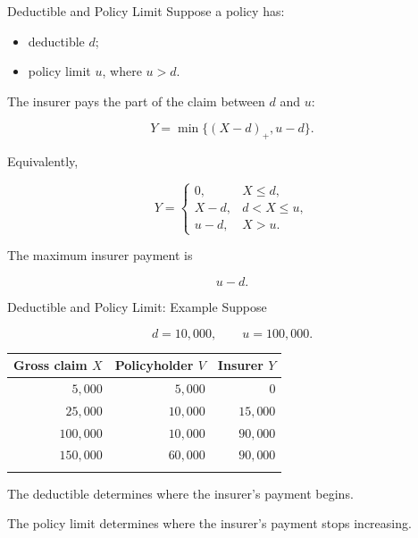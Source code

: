 \documentclass[
  ignorenonframetext,
  aspectratio=169,
]{beamer}
\newcounter{none} %
\providecommand{\tightlist}{%
  \setlength{\itemsep}{0pt}\setlength{\parskip}{0pt}}
\begin{document}
\begin{frame}{Deductible and Policy Limit}
\protect{}\label{deductible-and-policy-limit}
Suppose a policy has:

\begin{itemize}
\tightlist
\item
  deductible \(d\);
\item
  policy limit \(u\), where \(u>d\).
\end{itemize}

The insurer pays the part of the claim between \(d\) and \(u\):

\[
\boxed{
Y=\min\{(X-d)_+,u-d\}.
}
\]

Equivalently,

\[
Y=
\begin{cases}
0, & X\leq d,\\
X-d, & d<X\leq u,\\
u-d, & X>u.
\end{cases}
\]

The maximum insurer payment is

\[
\boxed{u-d}.
\]
\end{frame}

\begin{frame}{Deductible and Policy Limit: Example}
\protect{}\label{deductible-and-policy-limit-example}
Suppose

\[
d=10{,}000,
\qquad
u=100{,}000.
\]

{\def\LTcaptype{none} %
\begin{longtable}[]{@{}rrr@{}}
\toprule\noalign{}
Gross claim \(X\) & Policyholder \(V\) & Insurer \(Y\) \\
\midrule\noalign{}
\endhead
\(5{,}000\) & \(5{,}000\) & \(0\) \\
\(25{,}000\) & \(10{,}000\) & \(15{,}000\) \\
\(100{,}000\) & \(10{,}000\) & \(90{,}000\) \\
\(150{,}000\) & \(60{,}000\) & \(90{,}000\) \\
\bottomrule\noalign{}
\end{longtable}
}

The deductible determines where the insurer's payment begins.

The policy limit determines where the insurer's payment stops
increasing.
\end{frame}
\end{document}
